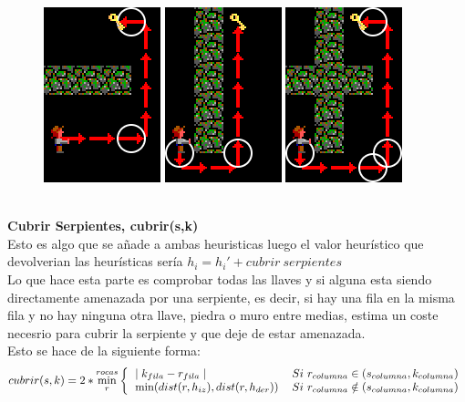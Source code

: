 \documentclass[11pt,spanish]{article}
\begin{document}
			\begin{figure}[h!]
				\centering
				\includegraphics[width=0.2\linewidth]{Horizontal.png}
				\includegraphics[width=0.2\linewidth]{Vertical.png}
				\includegraphics[width=0.2\linewidth]{HorizontalVertical.png}
			\end{figure}
			\\
			\textbf{Cubrir Serpientes, cubrir(s,k)}\\
			Esto es algo que se añade a ambas heuristicas luego el valor heurístico que devolverian las heurísticas sería $h_i = h_i'+cubrir\ serpientes$\\
			Lo que hace esta parte es comprobar todas las llaves y si alguna esta siendo directamente amenazada por una serpiente, es decir, si hay una fila en la misma fila y no hay ninguna otra llave, piedra o muro entre medias, estima un coste necesrio para cubrir la serpiente y que deje de estar amenazada.\\
			Esto se hace de la siguiente forma:
			\[
				cubrir(s,k) = 2*\min\limits_r^{rocas}
				\bigg \{
				\begin{tabular}{ll}
					$\mid k_{fila}-r_{fila} \mid $& $Si\ r_{columna} \in (s_{columna}, k_{columna})$\\
					$\min(dist(r,h_{iz}),dist(r,h_{der}))$&$ Si\ r_{columna} \notin (s_{columna}, k_{columna})$\\
				\end{tabular}
			\]
\end{document}

